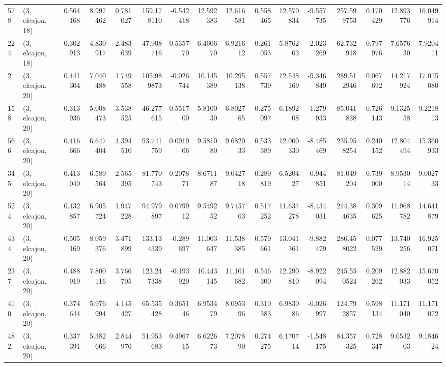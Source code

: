\begin{tabular}{llrrrrrrrrrrrrrr}
578 &  (3, elcajon, 18) &   0.564168 &   8.997462 &   0.781027 &   159.178110 &  -0.542418 &  12.592383 &  12.616581 &  0.558465 &  12.570834 &  -9.557735 &   257.599753 &  0.170429 &  12.893776 &  16.049914 \\
224 &  (3, elcajon, 18) &   0.302913 &   4.830917 &   2.483639 &    47.908716 &   0.535770 &   6.460670 &   6.921612 &  0.261053 &   5.876203 &  -2.023269 &    62.732918 &  0.797976 &   7.657630 &   7.920411 \\
2   &  (3, elcajon, 20) &   0.441304 &   7.040488 &   1.749558 &   105.989873 &  -0.026744 &  10.145389 &  10.295138 &  0.557739 &  12.548169 &  -9.346849 &   289.512946 &  0.067692 &  14.217924 &  17.015080 \\
158 &  (3, elcajon, 20) &   0.313936 &   5.008473 &   3.538525 &    46.277615 &   0.551700 &   5.810030 &   6.802765 &  0.275097 &   6.189208 &  -1.279933 &    85.041838 &  0.726143 &   9.132558 &   9.221813 \\
566 &  (3, elcajon, 20) &   0.416666 &   6.647404 &   1.394510 &    93.741759 &   0.091906 &   9.581080 &   9.682033 &  0.533389 &  12.000330 &  -8.485469 &   235.958254 &  0.240152 &  12.804494 &  15.360933 \\
345 &  (3, elcajon, 20) &   0.413040 &   6.589564 &   2.565395 &    81.770743 &   0.207871 &   8.671187 &   9.042718 &  0.289819 &   6.520427 &  -0.944851 &    81.049204 &  0.739000 &   8.953014 &   9.002733 \\
524 &  (3, elcajon, 20) &   0.432857 &   6.905724 &   1.947228 &    94.979897 &   0.079912 &   9.549252 &   9.745763 &  0.517252 &  11.637278 &  -8.434031 &   214.384635 &  0.309625 &  11.968782 &  14.641879 \\
434 &  (3, elcajon, 20) &   0.505169 &   8.059376 &   3.471899 &   133.134339 &  -0.289697 &  11.003647 &  11.538385 &  0.579661 &  13.041361 &  -9.882479 &   286.458022 &  0.077529 &  13.740256 &  16.925071 \\
237 &  (3, elcajon, 20) &   0.488919 &   7.800116 &   3.766705 &   123.247338 &  -0.193920 &  10.443145 &  11.101682 &  0.546300 &  12.290810 &  -8.922094 &   245.550524 &  0.209262 &  12.882033 &  15.670052 \\
410 &  (3, elcajon, 20) &   0.374644 &   5.976994 &   4.145427 &    65.535428 &   0.365146 &   6.953479 &   8.095396 &  0.310383 &   6.983086 &  -0.026997 &   124.792857 &  0.598134 &  11.171040 &  11.171072 \\
482 &  (3, elcajon, 20) &   0.337391 &   5.382666 &   2.844976 &    51.953683 &   0.496715 &   6.622673 &   7.207890 &  0.274275 &   6.170714 &  -1.548175 &    84.357325 &  0.728347 &   9.053203 &   9.184624 \\

\end{tabular}
